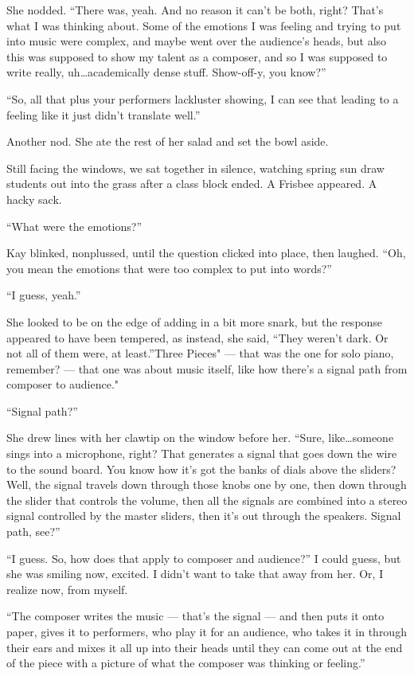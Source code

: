 She nodded. ``There was, yeah. And no reason it can't be both, right? That's what I was thinking about. Some of the emotions I was feeling and trying to put into music were complex, and maybe went over the audience's heads, but also this was supposed to show my talent as a composer, and so I was supposed to write really, uh\ldots academically dense stuff. Show-off-y, you know?''

``So, all that plus your performers lackluster showing, I can see that leading to a feeling like it just didn't translate well.''

Another nod. She ate the rest of her salad and set the bowl aside.

Still facing the windows, we sat together in silence, watching spring sun draw students out into the grass after a class block ended. A Frisbee appeared. A hacky sack.

``What were the emotions?''

Kay blinked, nonplussed, until the question clicked into place, then laughed. ``Oh, you mean the emotions that were too complex to put into words?''

``I guess, yeah.''

She looked to be on the edge of adding in a bit more snark, but the response appeared to have been tempered, as instead, she said, ``They weren't dark. Or not all of them were, at least.''Three Pieces" --- that was the one for solo piano, remember? --- that one was about music itself, like how there's a signal path from composer to audience."

``Signal path?''

She drew lines with her clawtip on the window before her. ``Sure, like\ldots someone sings into a microphone, right? That generates a signal that goes down the wire to the sound board. You know how it's got the banks of dials above the sliders? Well, the signal travels down through those knobs one by one, then down through the slider that controls the volume, then all the signals are combined into a stereo signal controlled by the master sliders, then it's out through the speakers. Signal path, see?''

``I guess. So, how does that apply to composer and audience?'' I could guess, but she was smiling now, excited. I didn't want to take that away from her. Or, I realize now, from myself.

``The composer writes the music --- that's the signal --- and then puts it onto paper, gives it to performers, who play it for an audience, who takes it in through their ears and mixes it all up into their heads until they can come out at the end of the piece with a picture of what the composer was thinking or feeling.''

